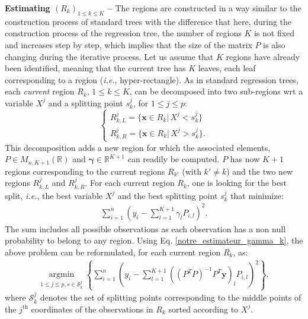 \documentclass[twoside,11pt]{article}
\begin{document}
\noindent \textbf{Estimating $(R_k)_{1 \le k \le K}$ --} The regions are constructed in a way similar to the construction process of standard trees with the difference that here, during the construction process of the regression tree, the number of regions $K$ is not fixed and increases step by step, which implies that the size of the matrix $P$ is also changing during the iterative process. Let us assume that $K$ regions have already been identified, meaning that the current tree has $K$ leaves, each leaf corresponding to a region (\textit{i.e.}, hyper-rectangle). 
As in standard regression trees, each \textit{current}  region $R_k, \, 1 \le k \le K$, can be decomposed into two sub-regions wrt a variable $X^j$ and a splitting point $s_k^j$, for $1\leq j \leq p$:
%
\begin{equation*}
\left\{
\begin{array}{l}
R^j_{k,L}=\{\boldsymbol{x}\in R_k|\, X^j<s_k^j \} \\
R^j_{k,R}=\{\boldsymbol{x} \in R_k|\,X^j>s_k^j\}.
\end{array}
\right.
\end{equation*}
%
This decomposition adds a new region  for which the associated elements, $P\in M_{n,K+1}(\mathbb{R})$ and  $\boldsymbol{\gamma} \in \mathbb{R}^{K+1}$ can readily be computed. $P$ has now $K+1$ regions corresponding to the current regions $R_{k'}$ (with $k' \ne k$) and the two new regions $R^j_{k,L}$ and $R^j_{k,R}$. For each current region $R_k$, one is looking for the best split, \textit{i.e.}, the best variable $X^j$ and the best splitting point $s^j_k$ that minimize:
%
\begin{align*}
\sum_{i=1}^n \left(y_i - \sum_{l=1}^{K+1} \gamma_l {P}_{i,l}\right)^2.
\end{align*}
%
The sum includes all possible observations as each observation has a non null probability to belong to any region. 
Using Eq. \eqref{notre_estimateur_gamma_k}, the above problem can be reformulated, for each current region $R_k$, as:
%
\begin{align}
\underset{1\leq j \leq p, s \in \mathcal{S}_k^j}{\operatorname{argmin}} \left\{  \sum_{i=1}^n \left(y_i - \sum_{l=1}^{K+1} \left(\left(P^T P\right)^{-1}  P^T  \boldsymbol{y}\right)_l {P}_{i,l}\right)^2 \right\},
\label{min-split}\end{align}
%
where $\mathcal{S}_k^j$ denotes the set of splitting points corresponding to the middle points of the $j^{\text{th}}$ coordinates of the observations in $R_k$ sorted according to $X^j$.
\end{document}
